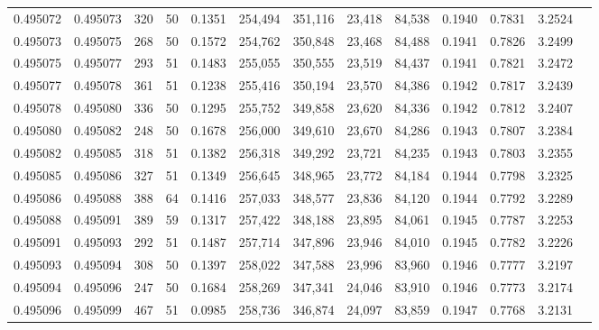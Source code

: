 \begin{tabular}{rrrrrrrrrrrrr}
0.495072 & 0.495073 &   320 &  50 &                                     0.1351 & 254,494 & 351,116 &  23,418 &  84,538 & 0.1940 & 0.7831 & 3.2524 \\
0.495073 & 0.495075 &   268 &  50 &                                     0.1572 & 254,762 & 350,848 &  23,468 &  84,488 & 0.1941 & 0.7826 & 3.2499 \\
0.495075 & 0.495077 &   293 &  51 &                                     0.1483 & 255,055 & 350,555 &  23,519 &  84,437 & 0.1941 & 0.7821 & 3.2472 \\
0.495077 & 0.495078 &   361 &  51 &                                     0.1238 & 255,416 & 350,194 &  23,570 &  84,386 & 0.1942 & 0.7817 & 3.2439 \\
0.495078 & 0.495080 &   336 &  50 &                                     0.1295 & 255,752 & 349,858 &  23,620 &  84,336 & 0.1942 & 0.7812 & 3.2407 \\
0.495080 & 0.495082 &   248 &  50 &                                     0.1678 & 256,000 & 349,610 &  23,670 &  84,286 & 0.1943 & 0.7807 & 3.2384 \\
0.495082 & 0.495085 &   318 &  51 &                                     0.1382 & 256,318 & 349,292 &  23,721 &  84,235 & 0.1943 & 0.7803 & 3.2355 \\
0.495085 & 0.495086 &   327 &  51 &                                     0.1349 & 256,645 & 348,965 &  23,772 &  84,184 & 0.1944 & 0.7798 & 3.2325 \\
0.495086 & 0.495088 &   388 &  64 &                                     0.1416 & 257,033 & 348,577 &  23,836 &  84,120 & 0.1944 & 0.7792 & 3.2289 \\
0.495088 & 0.495091 &   389 &  59 &                                     0.1317 & 257,422 & 348,188 &  23,895 &  84,061 & 0.1945 & 0.7787 & 3.2253 \\
0.495091 & 0.495093 &   292 &  51 &                                     0.1487 & 257,714 & 347,896 &  23,946 &  84,010 & 0.1945 & 0.7782 & 3.2226 \\
0.495093 & 0.495094 &   308 &  50 &                                     0.1397 & 258,022 & 347,588 &  23,996 &  83,960 & 0.1946 & 0.7777 & 3.2197 \\
0.495094 & 0.495096 &   247 &  50 &                                     0.1684 & 258,269 & 347,341 &  24,046 &  83,910 & 0.1946 & 0.7773 & 3.2174 \\
0.495096 & 0.495099 &   467 &  51 &                                     0.0985 & 258,736 & 346,874 &  24,097 &  83,859 & 0.1947 & 0.7768 & 3.2131 \\

\end{tabular}
